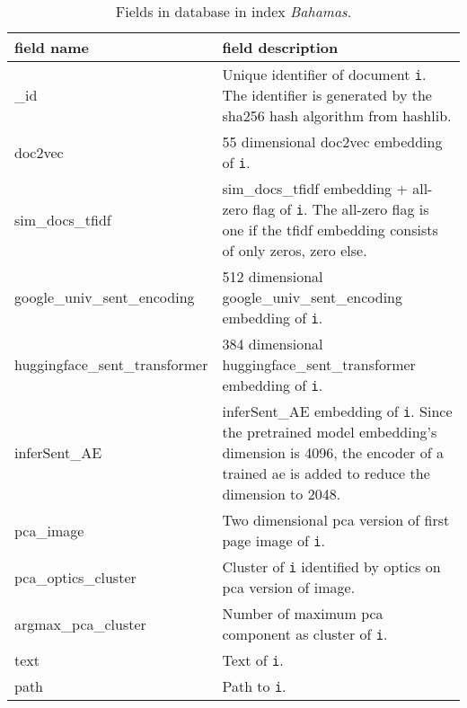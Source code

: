 \begin{table}[]
    \caption{Fields in \databaseName{} database in index \textit{Bahamas}.}
    \begin{tabular}{|
    >{\columncolor[HTML]{EFEFEF}}l |p{}|}
    \hline
    \cellcolor[HTML]{C0C0C0}\textbf{field name} & \cellcolor[HTML]{C0C0C0}\textbf{field description}                                     \\ \hline
    \_id                                        & Unique identifier of document \texttt{i}. The identifier is generated by the sha256 hash algorithm from hashlib.\\ \hline
    doc2vec                                     & 55 dimensional doc2vec embedding of \texttt{i}.                                                          \\ \hline
    sim\_docs\_tfidf                            & sim\_docs\_tfidf embedding + all-zero flag of \texttt{i}. The all-zero flag is one if the \ac{tfidf} embedding consists of only zeros, zero else.\\ \hline
    google\_univ\_sent\_encoding                & 512 dimensional google\_univ\_sent\_encoding embedding of \texttt{i}.                                     \\ \hline
    huggingface\_sent\_transformer              & 384 dimensional huggingface\_sent\_transformer embedding of \texttt{i}.                                  \\ \hline
    inferSent\_AE                               & inferSent\_AE embedding of \texttt{i}. Since the pretrained \infersent{} model embedding's dimension is 4096, the encoder of a trained \ac{ae} is added to reduce the dimension to 2048.                                                    \\ \hline
    pca\_image                                  & Two dimensional \ac{pca} version of first page image of \texttt{i}.                      \\ \hline
    pca\_optics\_cluster                        & Cluster of \texttt{i} identified by \acs{optics} on \ac{pca} version of image.            \\ \hline
    argmax\_pca\_cluster                        & Number of maximum \ac{pca} component as cluster of \texttt{i}.                            \\ \hline
    text                                        & Text of \texttt{i}.                                                                       \\ \hline
    path                                        & Path to \texttt{i}.                                                     \\ \hline
    \end{tabular}
    \label{tbl:Elasticsearch-fields}
\end{table}

